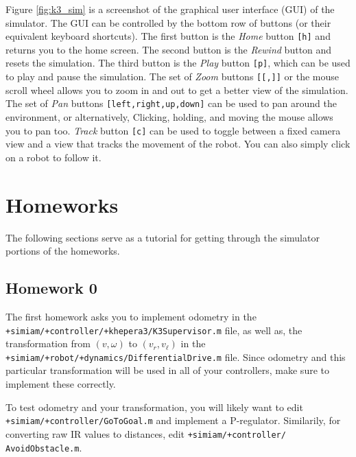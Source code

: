 \documentclass[10pt]{article}
\begin{document}
Figure \ref{fig:k3_sim} is a screenshot of the graphical user interface (GUI) of the simulator. The GUI can be controlled by the bottom row of buttons (or their equivalent keyboard shortcuts). The first button is the \textit{Home} button \texttt{[h]} and returns you to the home screen. The second button is the \textit{Rewind} button and resets the simulation. The third button is the \textit{Play} button \texttt{[p]}, which can be used to play and pause the simulation. The set of \textit{Zoom} buttons \texttt{[[,]]} or the mouse scroll wheel allows you to zoom in and out to get a better view of the simulation. The set of \textit{Pan} buttons \texttt{[left,right,up,down]} can be used to pan around the environment, or alternatively, Clicking, holding, and moving the mouse allows you to pan too. \textit{Track} button \texttt{[c]} can be used to toggle between a fixed camera view and a view that tracks the movement of the robot. You can also simply click on a robot to follow it.

\section*{Homeworks}

The following sections serve as a tutorial for getting through the simulator portions of the homeworks.

\subsection*{Homework 0}
The first homework asks you to implement odometry in the \texttt{+simiam/+controller/+khepera3/K3Supervisor.m} file, as well as, the transformation from $(v,\omega)$ to $(v_r,v_\ell)$ in the \texttt{+simiam/+robot/+dynamics/DifferentialDrive.m} file. Since odometry and this particular transformation will be used in all of your controllers, make sure to implement these correctly.

To test odometry and your transformation, you will likely want to edit \texttt{+simiam/+controller/GoToGoal.m} and implement a P-regulator. Similarily, for converting raw IR values to distances, edit \texttt{+simiam/+controller/}
\texttt{AvoidObstacle.m}.
\end{document}
